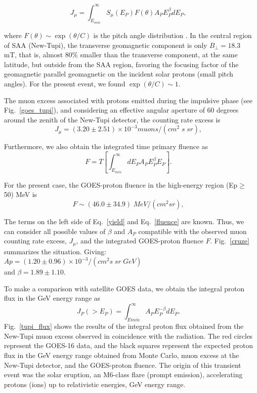 \documentclass[twocolumn]{aastex63}
\begin{document}
\begin{equation}
J_{\mu}= \int_{E_{min}}^{\infty}S_{\mu}(E_P)F(\theta)A_P E_P^{\beta}dE_P,
\label{counting}
\end{equation}

where $F(\theta) \sim \exp(\theta/C)$ is the pitch angle distribution \citep{shea82,miro05}. In the central region of SAA (New-Tupi), the transverse geomagnetic component is only $B_{\perp} =18.3$ mT, that is, almost 80\% smaller than the transverse component, at the same latitude, but outside from the SAA region, favoring the focusing factor of the geomagnetic parallel geomagnetic on the incident solar protons (small pitch angles). 
For the present event, we found $\exp(\theta /C) \sim 1$.

The muon excess associated with protons emitted during the impulsive phase (see Fig.~\ref{goes_tupi}), and considering an effective angular aperture of  60 degrees around the zenith of the New-Tupi detector, the counting rate excess is
\begin{equation}
J_{\mu}= (3.20 \pm 2.51) \times 10^{-3} muons/(cm^2\;s\;sr),
\end{equation}


Furthermore, we also obtain the integrated time primary 
fluence as
\begin{equation}
F=T 
\left[\int_{E_{min}}^{\infty}dE_P A_P E_P^{\beta}E_P\right].
\label{fluence}
\end{equation}

For the present case, the GOES-proton fluence in the high-energy region (Ep$\geq$50) MeV is
\begin{equation}
F \sim (46.0 \pm 34.9) \;MeV/(cm^2 sr),
\end{equation}

The terms on the left side of Eq.~\ref{yield} and Eq.~\ref{fluence} are known. Thus, we can consider all possible values of $\beta$ and $A_P$ compatible with the observed muon counting rate excess, $J_{\mu}$, and the integrated GOES-proton fluence $F$. Fig.~\ref{cruze} summarizes the situation. Giving:\\
$Ap=(1.20\pm 0.96) \times 10^{-3}/(cm^2s\;sr\;GeV)$\\ and $\beta=1.89\pm 1.10$.

To make a comparison with satellite GOES data, we obtain the integral proton flux in the GeV energy range as
\begin{equation}
J_P(>E_P)=\int_{Emin}^{\infty} A_P E_P^{-\beta}dE_P.
\end{equation}
Fig.~\ref{tupi_flux} shows the results of the integral proton flux obtained from the New-Tupi muon excess observed in coincidence with the radiation. The red circles represent the GOES-16 data, and the black squares represent the expected proton flux in the GeV energy range obtained from Monte Carlo, muon excess at the New-Tupi detector, and the GOES-proton fluence.
The origin of this transient event was the solar eruption, an M6-class flare (prompt emission), accelerating protons (ions) up to relativistic energies, GeV energy range. 
 
\end{document}
